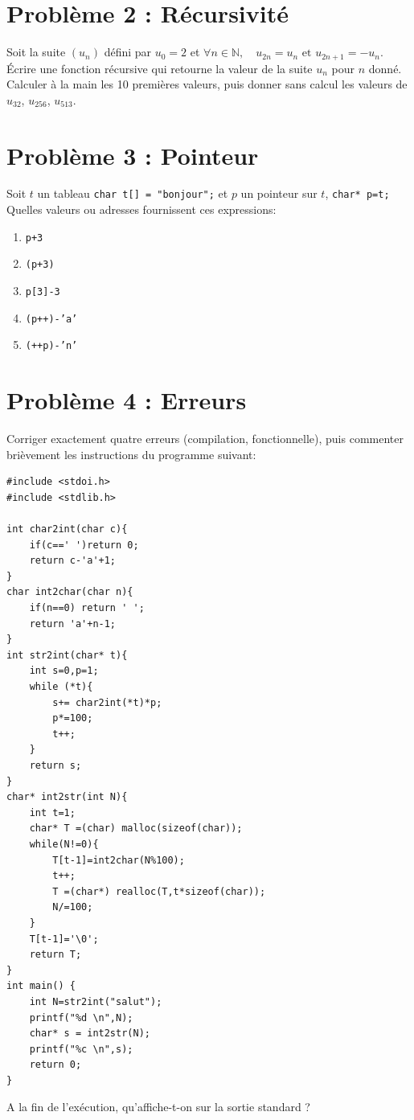 \documentclass{article}
\begin{document}
\section*{Problème 2 : Récursivité}
Soit la suite $(u_n)$ défini par $u_0=2$ et $\forall n\in \mathbb{N},\quad u_{2n} = u_n  \mbox{ et }u_{2n+1}=-u_n$. 
 Écrire une fonction récursive qui retourne la valeur de la suite $u_n$ pour $n$ donné. Calculer à la main les 10
premières valeurs, puis donner sans calcul les valeurs de $u_{32}$, $u_{256}$, $u_{513}$.

\section*{Problème 3 : Pointeur}
Soit $t$ un tableau {\tt char t[] = "bonjour";} et $p$ un pointeur sur $t$,  {\tt char* p=t;}
Quelles valeurs ou adresses fournissent ces expressions:
\begin{enumerate}
\item {\tt *p+3}
\item  {\tt *(p+3)}
\item {\tt p[3]-3}
\item  {\tt *(p++)-'a'}
\item  {\tt *(++p)-'n'}

\end{enumerate}

\section*{Problème 4 : Erreurs}
Corriger exactement quatre erreurs (compilation, fonctionnelle), puis commenter
brièvement les instructions du programme suivant:
\begin{verbatim}
#include <stdoi.h>
#include <stdlib.h>

int char2int(char c){
    if(c==' ')return 0;
    return c-'a'+1;
}
char int2char(char n){
    if(n==0) return ' ';
    return 'a'+n-1;
}
int str2int(char* t){
    int s=0,p=1;
    while (*t){
        s+= char2int(*t)*p;
        p*=100;
        t++;
    }
    return s;
}
char* int2str(int N){
    int t=1;
    char* T =(char) malloc(sizeof(char));
    while(N!=0){
        T[t-1]=int2char(N%100);
        t++;
        T =(char*) realloc(T,t*sizeof(char));
        N/=100;
    }
    T[t-1]='\0';
    return T;
}
int main() {
    int N=str2int("salut");
    printf("%d \n",N);
    char* s = int2str(N);
    printf("%c \n",s);
    return 0;
}

\end{verbatim}
A la fin de l'exécution, qu'affiche-t-on sur la sortie standard ?
\end{document}
